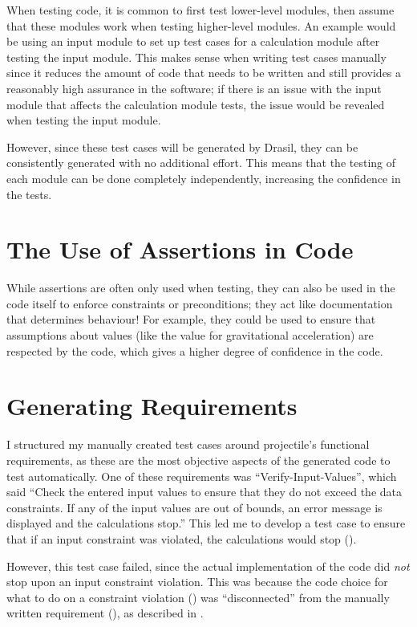 When testing code, it is common to first test lower-level modules, then assume
that these modules work when testing higher-level modules. An example would be
using an input module to set up test cases for a calculation module after
testing the input module. This makes sense when writing test cases manually
since it reduces the amount of code that needs to be written and still provides
a reasonably high assurance in the software; if there is an issue with the
input module that affects the calculation module tests, the issue would be
revealed when testing the input module.

However, since these test cases will be generated by Drasil, they can be
consistently generated with no additional effort. This means that the testing
of each module can be done completely independently, increasing the confidence
in the tests.

\section{The Use of Assertions in Code}
\label{chap:dev-proc:code-assertions}

While assertions are often only used when testing, they can also be used in
the code itself to enforce constraints or preconditions; they act like
documentation that determines behaviour! For example, they could be used to
ensure that assumptions about values (like the value for gravitational
acceleration) are respected by the code, which gives a higher degree of
confidence in the code.

\section{Generating Requirements}
\label{chap:dev-proc:gen-reqs}

I structured my manually created test cases around \acs{projectile}'s functional
requirements, as these are the most objective aspects of the generated code to
test automatically. One of these requirements was ``Verify-Input-Values'',
which said ``Check the entered input values to ensure that they do not exceed
the data constraints. If any of the input values are out of bounds, an error
message is displayed and the calculations stop.'' This led me to develop a test
case to ensure that if an input constraint was violated, the
calculations would stop ().

However, this test case failed,
since the actual implementation of the code did \emph{not} stop upon an input
constraint violation. This was because the code choice for what to do on a
constraint violation () was ``disconnected'' from the
manually written requirement (), as described in
. 

